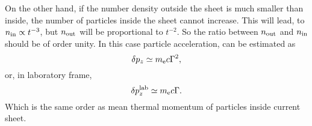 \documentclass[useAMS,usenatbib]{mn2e}
\begin{document}
 { On the other hand, if the number density outside the sheet is much 
 smaller than inside, the number of particles inside the sheet cannot increase. This 
 will lead, to $n_{\rm in}\propto t^{-3}$, but $n_{\rm out}$ 
 will be proportional to $t^{-2}$. So the ratio between $n_{\rm out}$ and $n_{\rm in}$ 
 should be of order unity.}
 In this case particle acceleration, can be estimated as
\begin{equation}
    \delta p_z\simeq m_{\rm e}c \Gamma^2,
\end{equation}
or, in laboratory frame,
\begin{equation}
    \delta p_{z}^{\rm lab} \simeq m_{\rm e}c \Gamma.
\end{equation}
 Which is the same order as mean thermal momentum of particles inside current sheet.
 
 
\end{document}
